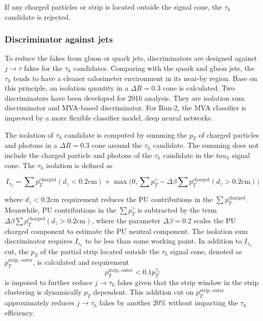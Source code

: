 \noindent If any charged particles or strip is located outside the signal cone, the $\tau_h$ candidate is rejected.

\subsubsection{Discriminator against jets}

To reduce the fakes from gluon or quark jets, 
discriminators are designed against $j\to \tau$ fakes for the $\tau_h$ candidates. Comparing with the quark and gluon jets, the $\tau_h$ tends to have a cleaner calorimeter environment in its near-by region. Base on this principle, an isolation quantity in a $\Delta R = 0.3$ cone is calculated. Two discriminators have been developed for 2016 analysis. They are isolation sum discriminator and MVA-based discriminator. For Run-2, the MVA classifier is improved by a more flexible classifier model, deep neural networks. 

The isolation of $\tau_h$ candidate is computed by summing the $p_T$ of charged particles and photons in a $\Delta R = 0.3$ cone around the $\tau_h$ candidate. The summing does not include the charged particle and photons of the $\tau_h$ candidate in the $tau_h$ signal cone. The $\tau_h$ isolation is defined as

\begin{equation}
	I_{\tau_h} = \sum p_T^{\text{charged}} (d_z<0.2 \text{cm}) + \max \bigg( 0, \sum p_T^ \gamma - \Delta \beta \sum p_T^{\text{charged}} (d_z>0.2 \text{cm})  \bigg )
    \label{eqn:cmsexperiment:reconstruction:tauIso}
\end{equation}

\noindent where $d_z<0.2 \text{cm}$ requirement reduces the PU contributions in the $\sum p_T^{\text{charged}}$. Meanwhile, PU contributions in the $\sum p_T^ \gamma $ is subtracted by the term $\Delta \beta \sum p_T^{\text{charged}} (d_z>0.2 \text{cm}) $, where the parameter $\Delta \beta =0.2$ scales the PU charged component to estimate the PU neutral component. The isolation sum discriminator requires $I_{\tau_h} $ to be less than some working point. In addition to $I_{\tau_h}$ cut, the $p_T$ of the partial strip located outside the $\tau_h$ signal cone, denoted as $p_T^{\text{strip, outer}} $, is calculated and requirement
\begin{equation}
p_T^{\text{strip, outer}} < 0.1 p_T^{\tau_h}
\end{equation}
\noindent is imposed to further reduce $j \to \tau_h$ fakes given that the strip window in the strip clustering is dynamically $p_T$ dependent. This addition cut on $p_T^{\text{strip, outer}}$ approximately reduces $j \to \tau_h$ fakes by another $20\%$ without impacting the $\tau_h$ efficiency.


